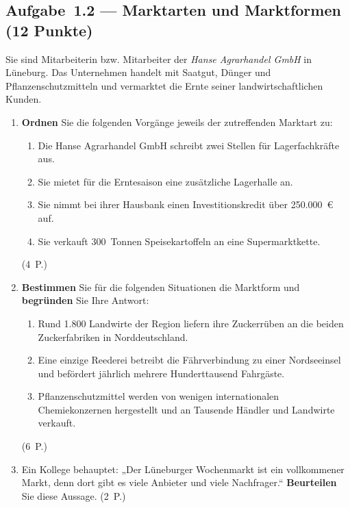 \subsection*{Aufgabe~1.2 --- Marktarten und Marktformen (12 Punkte)}

Sie sind Mitarbeiterin bzw. Mitarbeiter der \emph{Hanse Agrarhandel GmbH} in Lüneburg. Das
Unternehmen handelt mit Saatgut, Dünger und Pflanzenschutzmitteln und vermarktet die Ernte
seiner landwirtschaftlichen Kunden.

\begin{enumerate}[label=\alph*)]
  \item \textbf{Ordnen} Sie die folgenden Vorgänge jeweils der zutreffenden Marktart zu:
    \begin{enumerate}[label=(\arabic*)]
      \item Die Hanse Agrarhandel GmbH schreibt zwei Stellen für Lagerfachkräfte aus.
      \item Sie mietet für die Erntesaison eine zusätzliche Lagerhalle an.
      \item Sie nimmt bei ihrer Hausbank einen Investitionskredit über 250.000~€ auf.
      \item Sie verkauft 300~Tonnen Speisekartoffeln an eine Supermarktkette.
    \end{enumerate}
    \hfill (4~P.)
  \item \textbf{Bestimmen} Sie für die folgenden Situationen die Marktform und
    \textbf{begründen} Sie Ihre Antwort:
    \begin{enumerate}[label=(\arabic*)]
      \item Rund 1.800 Landwirte der Region liefern ihre Zuckerrüben an die beiden
        Zuckerfabriken in Norddeutschland.
      \item Eine einzige Reederei betreibt die Fährverbindung zu einer Nordseeinsel und
        befördert jährlich mehrere Hunderttausend Fahrgäste.
      \item Pflanzenschutzmittel werden von wenigen internationalen Chemiekonzernen
        hergestellt und an Tausende Händler und Landwirte verkauft.
    \end{enumerate}
    \hfill (6~P.)
  \item Ein Kollege behauptet: „Der Lüneburger Wochenmarkt ist ein vollkommener Markt, denn
    dort gibt es viele Anbieter und viele Nachfrager.`` \textbf{Beurteilen} Sie diese
    Aussage. \hfill (2~P.)
\end{enumerate}

